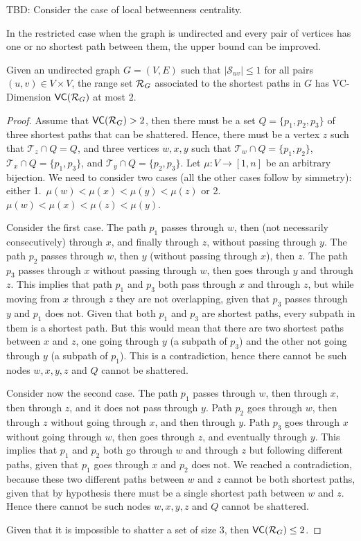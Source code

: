 \XXX TBD: Consider the case of local betweenness centrality. \MR

In the restricted case when the graph is undirected and every pair of vertices
has one or no shortest path between them, the upper bound can be improved.
\begin{lemma}\label{lem:vcdimuppboundunique}
  Given an undirected graph $G=(V,E)$ such that $|\mathcal{S}_{uv}|\le1$ for all
  pairs $(u,v)\in V\times V$, the range set $\mathcal{R}_G$ associated to the
  shortest paths in $G$ has VC-Dimension $\mathsf{VC}(\mathcal{R}_G)$ at most $2$.
\end{lemma}

\begin{proof}
  Assume that $\mathsf{VC}(\mathcal{R}_G)>2$, then there must be a set $Q=\{p_1,p_2,p_3\}$ of three
  shortest paths that can be shattered. Hence, there must be a vertex $z$ such that
  $\mathcal{T}_{z}\cap Q=Q$, and three vertices $w,x,y$ such
  that $\mathcal{T}_{w}\cap Q=\{p_1,p_2\}$, $\mathcal{T}_{x}\cap
  Q=\{p_1,p_3\}$, and $\mathcal{T}_{y}\cap Q=\{p_2,p_3\}$. Let $\mu:V\rightarrow
  [1,n]$ be an arbitrary bijection. We need to consider two
  cases (all the other cases follow by simmetry): either
  1.~$\mu(w)<\mu(x)<\mu(y)<\mu(z)$ or 2.~$\mu(w)<\mu(x)<\mu(z)<\mu(y)$.

  Consider the first case. The path $p_1$ passes through $w$, then (not
  necessarily consecutively) through $x$, and finally through $z$, without
  passing through $y$. The path $p_2$ passes through $w$, then $y$ (without
  passing through $x$), then $z$. The path $p_3$ passes through $x$ without
  passing through $w$, then goes through $y$ and through $z$. This implies that
  path $p_1$ and $p_3$ both pass through $x$ and through $z$, but while moving
  from $x$ through $z$ they are not overlapping, given that $p_3$ passes through
  $y$ and $p_1$ does not. Given that both $p_1$ and $p_3$ are shortest
  paths, every subpath in them is a shortest path. But this would mean that
  there are two shortest paths between $x$ and $z$, one going through $y$
  (a subpath of $p_3$) and the other not going through $y$ (a subpath of $p_1$).
  This is a contradiction, hence there cannot be such nodes $w,x,y,z$ and $Q$
  cannot be shattered.

  Consider now the second case. The path $p_1$ passes through $w$, then through
  $x$, then through $z$, and it does not pass through $y$. Path $p_2$ goes
  through $w$, then through $z$ without going through $x$, and then through $y$.
  Path $p_3$ goes through $x$ without going through $w$, then goes through $z$,
  and eventually through $y$. This implies that $p_1$ and $p_2$ both go through
  $w$ and through $z$ but following different paths, given that $p_1$ goes
  through $x$ and $p_2$ does not. We reached a contradiction, because these
  two different paths between $w$ and $z$ cannot be both shortest paths, given
  that by hypothesis there must be a single shortest path between $w$ and $z$.
  Hence there cannot be such nodes $w,x,y,z$ and $Q$ cannot be shattered.  

  Given that it is impossible to shatter a set of size $3$, then
  $\mathsf{VC}(\mathcal{R}_G)\le 2$.
\end{proof}

